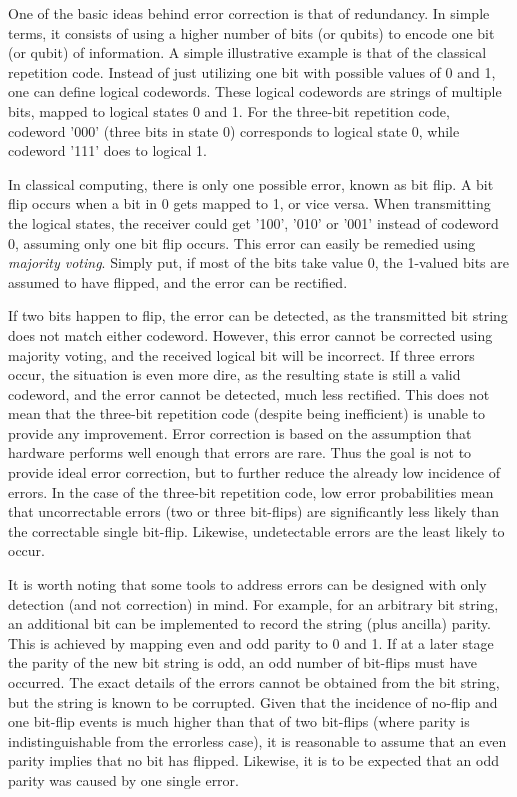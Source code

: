 One of the basic ideas behind error correction is that of redundancy. In simple terms, it consists of using a higher number of bits (or qubits) to encode one bit (or qubit) of information. A simple illustrative example is that of the classical repetition code. Instead of just utilizing one bit with possible values of 0 and 1, one can define logical codewords. These logical codewords are strings of multiple bits, mapped to logical states 0 and 1. For the three-bit repetition code, codeword '000' (three bits in state 0) corresponds to logical state 0, while codeword '111' does to logical 1. 

In classical computing, there is only one possible error, known as bit flip. A bit flip occurs when a bit in 0 gets mapped to 1, or vice versa. When transmitting the logical states, the receiver could get '100', '010' or '001' instead of codeword 0, assuming only one bit flip occurs. This error can easily be remedied using \textit{majority voting}. Simply put, if most of the bits take value 0, the 1-valued bits are assumed to have flipped, and the error can be rectified. 

If two bits happen to flip, the error can be detected, as the transmitted bit string does not match either codeword. However, this error cannot be corrected using majority voting, and the received logical bit will be incorrect. If three errors occur, the situation is even more dire, as the resulting state is still a valid codeword, and the error cannot be detected, much less rectified. This does not mean that the three-bit repetition code (despite being inefficient) is unable to provide any improvement. Error correction is based on the assumption that hardware performs well enough that errors are rare. Thus the goal is not to provide ideal error correction, but to further reduce the already low incidence of errors. In the case of the three-bit repetition code, low error probabilities mean that uncorrectable errors (two or three bit-flips) are significantly less likely than the correctable single bit-flip. Likewise, undetectable errors are the least likely to occur. 

It is worth noting that some tools to address errors can be designed with only detection (and not correction) in mind. For example, for an arbitrary bit string, an additional bit can be implemented to record the string (plus ancilla) parity. This is achieved by mapping even and odd parity to 0 and 1. If at a later stage the parity of the new bit string is odd, an odd number of bit-flips must have occurred. The exact details of the errors cannot be obtained from the bit string, but the string is known to be corrupted. Given that the incidence of no-flip and one bit-flip events is much higher than that of two bit-flips (where parity is indistinguishable from the errorless case), it is reasonable to assume that an even parity implies that no bit has flipped. Likewise, it is to be expected that an odd parity was caused by one single error.

